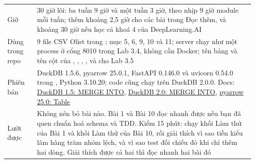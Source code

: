 
\begin{xltabular}{\textwidth}{@{}P{3.4cm} L@{}}
\toprule
{} &  \\
\midrule
\endhead
\bottomrule
\endfoot
Giờ & 30 giờ lõi: ba tuần 9 giờ và một tuần 3 giờ, theo nhịp 9 giờ module mỗi tuần; thêm khoảng 2,5 giờ cho các bài trong Đọc thêm, và khoảng 30 giờ nếu học cả khoá 4 của DeepLearning.AI \\
Dùng trong repo & 9 file CSV Olist trong ;  mục 5, 6, 9, 10 và 11; server  chạy như một process ở cổng 8010 trong Lab 3.4, không cần Docker; tên bảng và tên cột của , , , ,  và  cho Lab 3.5 \\
Phiên bản & DuckDB 1.5.6, pyarrow 25.0.1, FastAPI 0.146.0 và uvicorn 0.54.0 trong , Python 3.10.20; code cũng chạy trên DuckDB 2.0.0. Docs: \href{https://duckdb.org/docs/1.5/sql/statements/merge_into}{DuckDB 1.5: MERGE INTO}, \href{https://duckdb.org/docs/2.0/sql/statements/merge_into.html}{DuckDB 2.0: MERGE INTO}, \href{https://arrow.apache.org/docs/25.0/python/generated/pyarrow.Table.html}{pyarrow 25.0: Table} \\
Lướt được & Không nên bỏ bài nào. Bài 1 và Bài 10 đọc nhanh được nếu bạn đã quen chuẩn hoá schema và TDD. Kiểm 15 phút: chạy khối Làm thử của Bài 1 và khối Làm thử của Bài 10, rồi giải thích vì sao tiền kiểu  làm hàng trăm nhóm lệch, và vì sao test đối chiếu đỏ khi chỉ thêm hai dòng. Giải thích được cả hai thì đọc nhanh hai bài đó \\
\end{xltabular}

